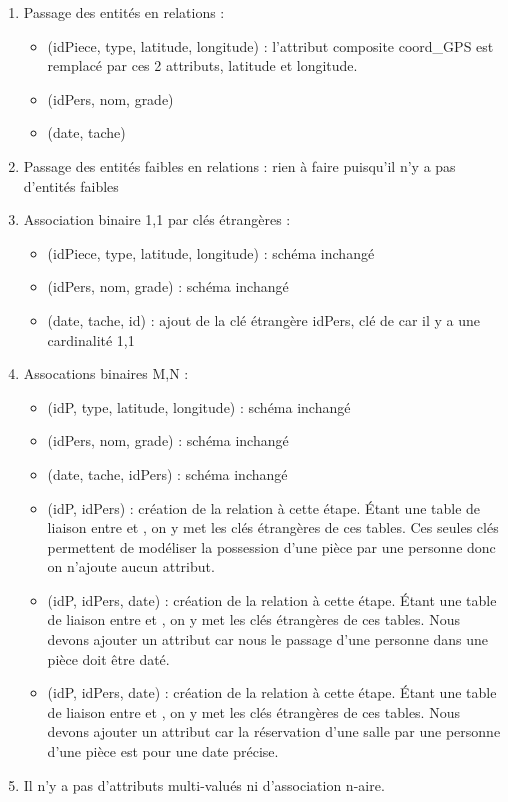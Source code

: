 \begin{enumerate}
	\item Passage des entités en relations :
		\begin{itemize}
			\item {}(idPiece, type, latitude, longitude) : l'attribut composite coord\_GPS est remplacé par ces 2 attributs, latitude et longitude.
			\item {}(idPers, nom, grade)
			\item {}(date, tache) 
		\end{itemize}
	\item Passage des entités faibles en relations : rien à faire puisqu'il n'y a pas d'entités faibles
	\item Association binaire 1,1 par clés étrangères :
		\begin{itemize}
			\item {}(idPiece, type, latitude, longitude) : schéma inchangé
			\item {}(idPers, nom, grade) : schéma inchangé
			\item {}(date, tache, id) : ajout de la clé étrangère idPers, clé de  car il y a une cardinalité 1,1
		\end{itemize}
	\item Assocations binaires M,N :
		\begin{itemize}
			\item {}(idP, type, latitude, longitude) : schéma inchangé
			\item {}(idPers, nom, grade) : schéma inchangé
			\item {}(date, tache, idPers) : schéma inchangé
			\item {}(idP, idPers) : création de la relation  à cette étape. Étant une table de liaison entre  et , on y met les clés étrangères de ces tables. Ces seules clés permettent de modéliser la possession d'une pièce par une personne donc on n'ajoute aucun attribut. 
			\item {}(idP, idPers, date) : création de la relation  à cette étape. Étant une table de liaison entre  et , on y met les clés étrangères de ces tables. Nous devons ajouter un attribut  car nous le passage d'une personne dans une pièce doit être daté.
			\item {}(idP, idPers, date) : création de la relation  à cette étape. Étant une table de liaison entre  et , on y met les clés étrangères de ces tables. Nous devons ajouter un attribut  car la réservation d'une salle par une personne d'une pièce est pour une date précise.
		\end{itemize}
	\item Il n'y a pas d'attributs multi-valués ni d'association n-aire.
\end{enumerate}

